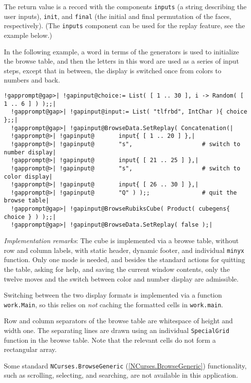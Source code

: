 \documentclass[a4paper,11pt]{report}
\begin{document}
{{{ The return value is a record with the components \texttt{inputs} (a string describing the user inputs), \texttt{init}, and \texttt{final} (the initial and final permutation of the faces, respectively). (The \texttt{inputs} component can be used for the replay feature, see the example below.) 

 In the following example, a word in terms of the generators is used to
initialize the browse table, and then the letters in this word are used as a
series of input steps, except that in between, the display is switched once
from colors to numbers and back. 

 
\begin{Verbatim}[commandchars=!@|,fontsize=\small,frame=single,label=Example]
  !gapprompt@gap>| !gapinput@choice:= List( [ 1 .. 30 ], i -> Random( [ 1 .. 6 ] ) );;|
  !gapprompt@gap>| !gapinput@input:= List( "tlfrbd", IntChar ){ choice };;|
  !gapprompt@gap>| !gapinput@BrowseData.SetReplay( Concatenation(|
  !gapprompt@>| !gapinput@       input{ [ 1 .. 20 ] },|
  !gapprompt@>| !gapinput@       "s",                    # switch to number display|
  !gapprompt@>| !gapinput@       input{ [ 21 .. 25 ] },|
  !gapprompt@>| !gapinput@       "s",                    # switch to color display|
  !gapprompt@>| !gapinput@       input{ [ 26 .. 30 ] },|
  !gapprompt@>| !gapinput@       "Q" ) );;               # quit the browse table|
  !gapprompt@gap>| !gapinput@BrowseRubiksCube( Product( cubegens{ choice } ) );;|
  !gapprompt@gap>| !gapinput@BrowseData.SetReplay( false );|
\end{Verbatim}
 \emph{Implementation remarks}: The cube is implemented via a browse table, without row and column labels,
with static header, dynamic footer, and individual \texttt{minyx} function. Only one mode is needed, and besides the standard actions for
quitting the table, asking for help, and saving the current window contents,
only the twelve moves and the switch between color and number display are
admissible. 

 Switching between the two display formats is implemented via a function \texttt{work.Main}, so this relies on \emph{not} caching the formatted cells in \texttt{work.main}. 

 Row and column separators of the browse table are whitespace of height and
width one. The separating lines are drawn using an individual \texttt{SpecialGrid} function in the browse table. Note that the relevant cells do not form a
rectangular array. 

 Some standard \texttt{NCurses.BrowseGeneric} (\ref{NCurses.BrowseGeneric}) functionality, such as scrolling, selecting, and searching, are not available
in this application. 

}}}
\end{document}
